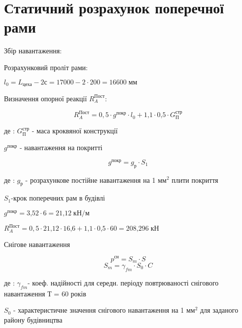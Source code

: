 \documentclass[a4paper,14pt]{article}
\begin{document}
\section{Статичний розрахунок поперечної рами}




Збір навантаження:


Розрахунковий проліт рами:

$l_0=L_{\textit{цеха}}-2с=17000-2\cdot 200=16600\;{\textit{мм}}$

Визначення опорної реакції $R^{\textit{Пост}}_A$:

\begin{equation}
    R^{\textit{Пост}}_A=0,5\cdot g^{\textit{покр}}\cdot l_0 + {\textit{1,1}}\cdot {\textit{0,5}}\cdot G^{\textit{стр}}_{\textit{П}}
\end{equation}

де : $G^{\textit{стр}}_{\textit{П}}$ - маса кроквяної конструкції

$g^{\textit{покр}}$ - навантаження на покритті

 
\begin{equation}
    g^{\textit{покр}}=g_{\textit{р}}\cdot S_1
\end{equation}

де : $g_{\textit{р}}$ - розрахункове постійне навантаження на 1 м$м^{\textit{2}}$ плити покриття

$S_1$-крок поперечних рам в будівлі

$g^{\textit{покр}}={\textit{3,52}}\cdot 6 = {\textit{21,12}}\;\textit{кН/м}$

$R^{\textit{Пост}}_A=0,5\cdot {\textit{21,12}}\cdot {\textit{16,6}}+ {\textit{1,1}}\cdot {\textit{0,5}}\cdot 60={\textit{208,296}}\;{\textit{кН}}$

Снігове навантаження

\begin{equation}
    p^{\textit{сн}}=S_{\textit{m}}\cdot S
\end{equation}
\begin{equation}
    S_m=\gamma_{fm}\cdot S_0 \cdot C
\end{equation}

де : $\gamma_{fm}$- коеф. надійності для середн. періоду повтрюваності снігового навантаження Т = 60 років 

$S_0$ - характеристичне значення снігового навантаження на 1 м$м^{\textit{2}}$ для заданого району будівництва
\end{document}
